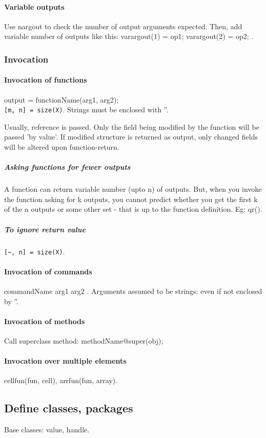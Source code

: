 \documentclass[oneside, article]{memoir}
\begin{document}
\paragraph*{Variable outputs}
Use nargout to check the number of output arguments expected. Then, add variable number of outputs like this: varargout(1) = {op1}; varargout(2) = {op2}; .

\subsubsection{Invocation}
\paragraph*{Invocation of functions}
output = functionName(arg1, arg2);\\
\verb'[m, n] = size(X)'. Strings must be enclosed with ''.

Usually, reference is passed. Only the field being modified by the function will be passed 'by value'. If modified structure is returned as output, only changed fields will be altered upon function-return.

\subparagraph*{Asking functions for fewer outputs}
A function can return variable number (upto n) of outputs. But, when you invoke the function asking for k outputs, you cannot predict whether you get the first k of the n outputs or some other set - that is up to the function definition. Eg: qr().

\subparagraph*{To ignore return value}
\verb'[~, n] = size(X)'.


\paragraph*{Invocation of commands}
commandName arg1 arg2 . Arguments assumed to be strings: even if not enclosed by ''.

\paragraph*{Invocation of methods}
Call superclass method: methodName@super(obj);

\paragraph*{Invocation over multiple elements}
cellfun(fun, cell), arrfun(fun, array).

\subsection{Define classes, packages}
Base classes: value, handle.
\end{document}
